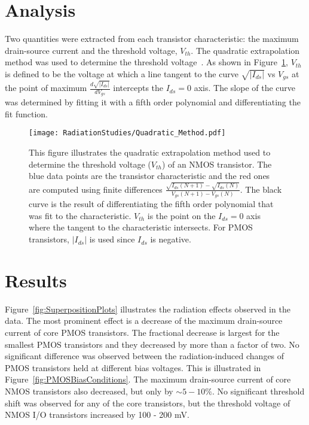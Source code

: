 \section{Analysis}

Two quantities were extracted from each transistor characteristic: the maximum drain-source current and the threshold voltage, $V_{th}$. The quadratic extrapolation method was used to determine the threshold voltage~\cite{QuadraticMethod}. As shown in Figure~\ref{fig:QuadraticMethod}, $V_{th}$ is defined to be the voltage at which a line tangent to the curve $\sqrt{|I_{ds}|}$ vs $V_{gs}$ at the point of maximum $\frac{d \sqrt{|I_{ds}|}}{dV_{gs}}$ intercepts the $I_{ds}=0$ axis. The slope of the curve was determined by fitting it with a fifth order polynomial and differentiating the fit function. 

\begin{figure}[h!]
\begin{center}
\texttt{[image: RadiationStudies/Quadratic\_Method.pdf]}
\end{center}
\caption{This figure illustrates the quadratic extrapolation method used to determine the threshold voltage ($V_{th}$) of an NMOS transistor. The blue data points are the transistor characteristic and the red ones are computed using finite differences $\frac{\sqrt{I_{ds}(N+1)}-\sqrt{I_{ds}(N)}}{V_{gs}(N+1)-V_{gs}(N)}$. The black curve is the result of differentiating the fifth order polynomial that was fit to the characteristic. $V_{th}$ is the point on the $I_{ds}=0$ axis where the tangent to the characteristic intersects. For PMOS transistors, $|I_{ds}|$ is used since $I_{ds}$ is negative.}
\label{fig:QuadraticMethod}
\end{figure}

\section{Results}

Figure~\ref{fig:SuperpositionPlots}  illustrates the radiation effects observed in the data.  The most prominent effect is a decrease of the maximum drain-source current of core PMOS transistors.  The fractional decrease is largest for the smallest PMOS transistors and they decreased by more than a factor of two.  No significant difference was observed between the radiation-induced changes of PMOS transistors held at different bias voltages. This is illustrated in Figure~\ref{fig:PMOSBiasConditions}. The maximum drain-source current of core NMOS transistors also decreased, but only by $\sim5-10\%$.  No significant threshold shift was observed for any of the core transistors, but the threshold voltage of NMOS I/O transistors increased by 100 - 200 mV.  

